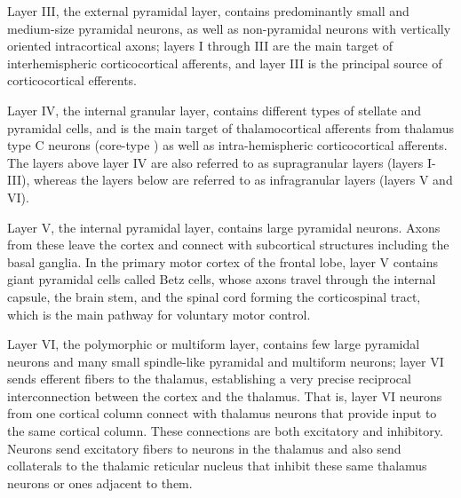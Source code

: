\documentclass[]{book}
\begin{document}
Layer III, the external pyramidal layer, contains predominantly small and medium-size pyramidal neurons, as well as non-pyramidal neurons with vertically oriented intracortical axons; layers I through III are the main target of interhemispheric corticocortical afferents, and layer III is the principal source of corticocortical efferents.

Layer IV, the internal granular layer, contains different types of stellate and pyramidal cells, and is the main target of thalamocortical afferents from thalamus type C neurons (core-type ) as well as intra-hemispheric corticocortical afferents. The layers above layer IV are also referred to as supragranular layers (layers I-III), whereas the layers below are referred to as infragranular layers (layers V and VI).

Layer V, the internal pyramidal layer, contains large pyramidal neurons. Axons from these leave the cortex and connect with subcortical structures including the basal ganglia. In the primary motor cortex of the frontal lobe, layer V contains giant pyramidal cells called Betz cells, whose axons travel through the internal capsule, the brain stem, and the spinal cord forming the corticospinal tract, which is the main pathway for voluntary motor control.

Layer VI, the polymorphic or multiform layer, contains few large pyramidal neurons and many small spindle-like pyramidal and multiform neurons; layer VI sends efferent fibers to the thalamus, establishing a very precise reciprocal interconnection between the cortex and the thalamus. That is, layer VI neurons from one cortical column connect with thalamus neurons that provide input to the same cortical column. These connections are both excitatory and inhibitory. Neurons send excitatory fibers to neurons in the thalamus and also send collaterals to the thalamic reticular nucleus that inhibit these same thalamus neurons or ones adjacent to them.
\end{document}

